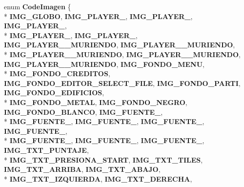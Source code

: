 \begin{DoxyCompactItemize}
\item 
enum {\bfseries Code\+Imagen} \{ \\*
{\bfseries I\+M\+G\+\_\+\+G\+L\+O\+BO}, 
{\bfseries I\+M\+G\+\_\+\+P\+L\+A\+Y\+E\+R\+\_}, 
{\bfseries I\+M\+G\+\_\+\+P\+L\+A\+Y\+E\+R\+\_}, 
{\bfseries I\+M\+G\+\_\+\+P\+L\+A\+Y\+E\+R\+\_}, 
\\*
{\bfseries I\+M\+G\+\_\+\+P\+L\+A\+Y\+E\+R\+\_}, 
{\bfseries I\+M\+G\+\_\+\+P\+L\+A\+Y\+E\+R\+\_}, 
{\bfseries I\+M\+G\+\_\+\+P\+L\+A\+Y\+E\+R\+\_\+\_\+\+M\+U\+R\+I\+E\+N\+DO}, 
{\bfseries I\+M\+G\+\_\+\+P\+L\+A\+Y\+E\+R\+\_\+\_\+\+M\+U\+R\+I\+E\+N\+DO}, 
\\*
{\bfseries I\+M\+G\+\_\+\+P\+L\+A\+Y\+E\+R\+\_\+\_\+\+M\+U\+R\+I\+E\+N\+DO}, 
{\bfseries I\+M\+G\+\_\+\+P\+L\+A\+Y\+E\+R\+\_\+\_\+\+M\+U\+R\+I\+E\+N\+DO}, 
{\bfseries I\+M\+G\+\_\+\+P\+L\+A\+Y\+E\+R\+\_\+\_\+\+M\+U\+R\+I\+E\+N\+DO}, 
{\bfseries I\+M\+G\+\_\+\+F\+O\+N\+D\+O\+\_\+\+M\+E\+NU}, 
\\*
{\bfseries I\+M\+G\+\_\+\+F\+O\+N\+D\+O\+\_\+\+C\+R\+E\+D\+I\+T\+OS}, 
{\bfseries I\+M\+G\+\_\+\+F\+O\+N\+D\+O\+\_\+\+E\+D\+I\+T\+O\+R\+\_\+\+S\+E\+L\+E\+C\+T\+\_\+\+F\+I\+LE}, 
{\bfseries I\+M\+G\+\_\+\+F\+O\+N\+D\+O\+\_\+\+P\+A\+R\+TI}, 
{\bfseries I\+M\+G\+\_\+\+F\+O\+N\+D\+O\+\_\+\+E\+D\+I\+F\+I\+C\+I\+OS}, 
\\*
{\bfseries I\+M\+G\+\_\+\+F\+O\+N\+D\+O\+\_\+\+M\+E\+T\+AL}, 
{\bfseries I\+M\+G\+\_\+\+F\+O\+N\+D\+O\+\_\+\+N\+E\+G\+RO}, 
{\bfseries I\+M\+G\+\_\+\+F\+O\+N\+D\+O\+\_\+\+B\+L\+A\+N\+CO}, 
{\bfseries I\+M\+G\+\_\+\+F\+U\+E\+N\+T\+E\+\_}, 
\\*
{\bfseries I\+M\+G\+\_\+\+F\+U\+E\+N\+T\+E\+\_}, 
{\bfseries I\+M\+G\+\_\+\+F\+U\+E\+N\+T\+E\+\_}, 
{\bfseries I\+M\+G\+\_\+\+F\+U\+E\+N\+T\+E\+\_}, 
{\bfseries I\+M\+G\+\_\+\+F\+U\+E\+N\+T\+E\+\_}, 
\\*
{\bfseries I\+M\+G\+\_\+\+F\+U\+E\+N\+T\+E\+\_}, 
{\bfseries I\+M\+G\+\_\+\+F\+U\+E\+N\+T\+E\+\_}, 
{\bfseries I\+M\+G\+\_\+\+F\+U\+E\+N\+T\+E\+\_}, 
{\bfseries I\+M\+G\+\_\+\+T\+X\+T\+\_\+\+P\+U\+N\+T\+A\+JE}, 
\\*
{\bfseries I\+M\+G\+\_\+\+T\+X\+T\+\_\+\+P\+R\+E\+S\+I\+O\+N\+A\+\_\+\+S\+T\+A\+RT}, 
{\bfseries I\+M\+G\+\_\+\+T\+X\+T\+\_\+\+T\+I\+L\+ES}, 
{\bfseries I\+M\+G\+\_\+\+T\+X\+T\+\_\+\+A\+R\+R\+I\+BA}, 
{\bfseries I\+M\+G\+\_\+\+T\+X\+T\+\_\+\+A\+B\+A\+JO}, 
\\*
{\bfseries I\+M\+G\+\_\+\+T\+X\+T\+\_\+\+I\+Z\+Q\+U\+I\+E\+R\+DA}, 
{\bfseries I\+M\+G\+\_\+\+T\+X\+T\+\_\+\+D\+E\+R\+E\+C\+HA}, 

\end{DoxyCompactItemize}
